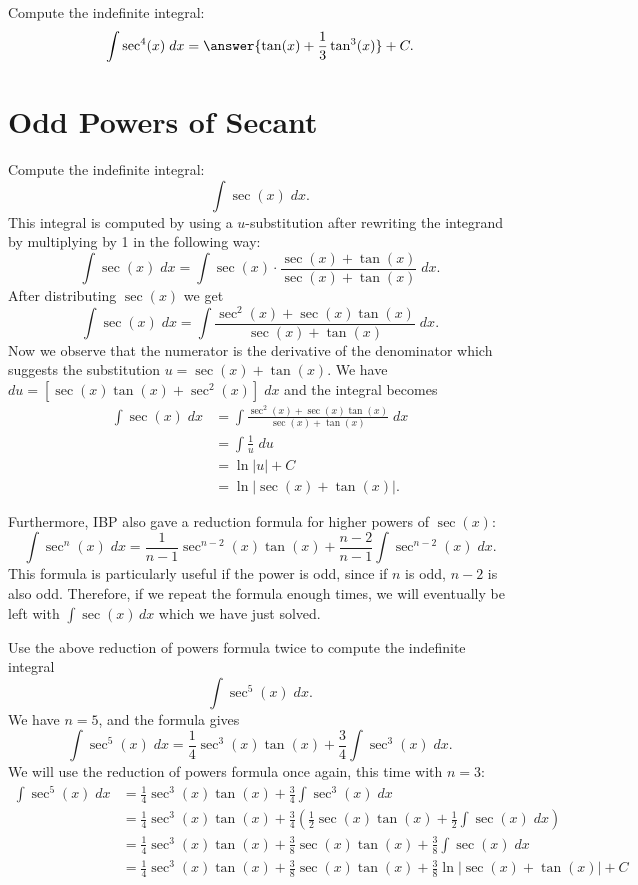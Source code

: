 \documentclass{ximera}
\begin{document}
\begin{problem}
Compute the indefinite integral:
\[
\int  \sec^4(x)\;dx = \answer{\tan(x) + \frac13 \tan^3(x)} + C.
\]
\end{problem}


\section{Odd Powers of Secant}
\begin{example}
Compute the indefinite integral:
\[
\int \sec(x) \; dx.
\]
This integral is computed by using a $u$-substitution after rewriting the integrand
by multiplying by 1 in the following way:
\[
\int \sec(x) \; dx = \int \sec(x) \cdot \frac{\sec(x) + \tan(x)}{\sec(x) + \tan(x)} \; dx.
\]
After distributing $\sec(x)$ we get
\[
\int \sec(x) \; dx = \int \frac{\sec^2(x) + \sec(x)\tan(x)}{\sec(x) + \tan(x)} \; dx.
\]
Now we observe that the numerator is the derivative of the denominator which suggests the substitution
$u = \sec(x) + \tan(x)$. We have $du = [ \sec(x)\tan(x) + \sec^2(x)] \; dx$ and the integral becomes
\begin{align*}
\int \sec(x) \; dx &= \int \frac{\sec^2(x) + \sec(x)\tan(x)}{\sec(x) + \tan(x)} \; dx\\
&= \int \frac{1}{u} \; du\\
&= \ln|u| + C\\
&= \ln|\sec(x) + \tan(x)|.
\end{align*}

\end{example}

Furthermore, IBP also gave a reduction formula for higher powers of $\sec(x)$:
\[
\int \sec^n(x) \; dx =  \frac{1}{n-1}\sec^{n-2}(x)\tan(x) + \frac{n-2}{n-1}\int \sec^{n-2}(x) \; dx. 
\]
This formula is particularly useful if
the power is odd, since if $n$ is odd, $n-2$ is also odd.  Therefore, if we repeat the formula enough times, 
we will eventually be left with $\int \sec(x) \, dx$
which we have just solved.

\begin{example}
Use the above reduction of powers formula twice to compute the indefinite integral
\[
\int \sec^5(x) \; dx.
\]
We have $n =5$, and the formula gives
\[
\int \sec^5(x) \; dx = \frac14 \sec^3(x)\tan(x) + \frac34 \int \sec^3(x) \; dx.
\]
We will use the reduction of powers formula once again, this time with $n=3$:
\begin{align*}
\int \sec^5(x) \; dx &= \frac14 \sec^3(x)\tan(x) + \frac34 \int \sec^3(x) \; dx\\
&= \frac14 \sec^3(x)\tan(x) + \frac34\left(\frac12\sec(x)\tan(x) + \frac12\int \sec(x) \; dx\right)\\
&=\frac14 \sec^3(x)\tan(x) + \frac38\sec(x)\tan(x) + \frac38 \int \sec(x) \; dx \\
&=\frac14 \sec^3(x)\tan(x) + \frac38\sec(x)\tan(x) + \frac38\ln|\sec(x) + \tan(x)| + C
\end{align*}
\end{example}
\end{document}
